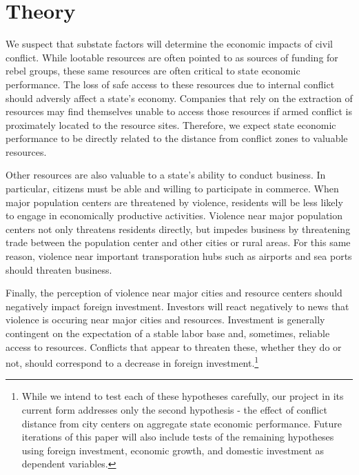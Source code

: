 \section{Theory}
\label{theory}


We suspect that substate factors will determine the economic impacts of civil conflict.  While lootable resources are often pointed to as sources of funding for rebel groups, these same resources are often critical to state economic performance.  The loss of safe access to these resources due to internal conflict should adversly affect a state's economy.  Companies that rely on the extraction of resources may find themselves unable to access those resources if armed conflict is proximately located to the resource sites.  Therefore, we expect state economic performance to be directly related to the distance from conflict zones to valuable resources.

Other resources are also valuable to a state's ability to conduct business.  In particular, citizens must be able and willing to participate in commerce.  When major population centers are threatened by violence, residents will be less likely to engage in economically productive activities.  Violence near major population centers not only threatens residents directly, but impedes business by threatening trade between the population center and other cities or rural areas.  For this same reason, violence near important transporation hubs such as airports and sea ports should threaten business.

Finally, the perception of violence near major cities and resource centers should negatively impact foreign investment.  Investors will react negatively to news that violence is occuring near major cities and resources.  Investment is generally contingent on the expectation of a stable labor base and, sometimes, reliable access to resources.  Conflicts that appear to threaten these, whether they do or not, should correspond to a decrease in foreign investment.\footnote{While we intend to test each of these hypotheses carefully, our project in its current form addresses only the second hypothesis - the effect of conflict distance from city centers on aggregate state economic performance.  Future iterations of this paper will also include tests of the remaining hypotheses using foreign investment, economic growth, and domestic investment as dependent variables.}

